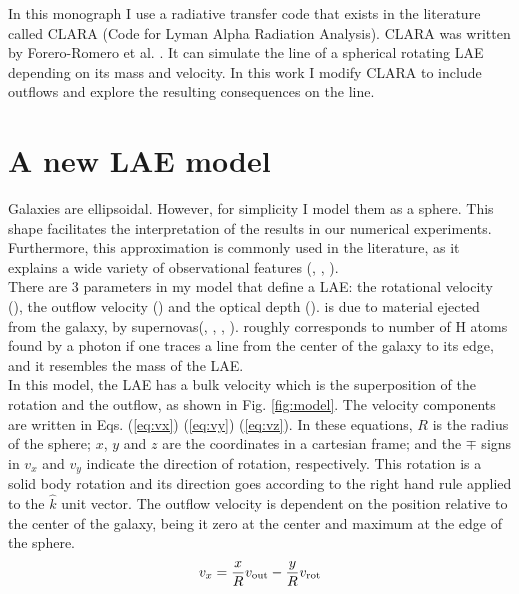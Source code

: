 \documentclass[twocolappendix]{latex/emulateapj}
\begin{document}
In this monograph I use a radiative transfer code that exists in the literature called CLARA (Code for Lyman Alpha Radiation Analysis). CLARA was written by Forero-Romero et al. \cite{CLARA}. It can simulate the \lya line of a spherical rotating LAE depending on its mass and velocity. In this work I modify CLARA to include outflows and explore the resulting consequences on the \lya line. \\


\section{A new LAE model}

\label{sec:newmodel}
Galaxies are ellipsoidal. However, for simplicity I model them as a sphere. This shape facilitates the interpretation of the results in our numerical experiments. Furthermore, this approximation is commonly used in the literature, as it explains a wide variety of observational features (\cite{Ahn03}, \cite{Verhamme06}, \cite{Dijkstra06}). \\

There are 3 parameters in my model that define a LAE: the rotational velocity (\vrot), the outflow velocity (\vout) and the optical depth (\tauh). \vout is due to material ejected from the galaxy, by supernovas(\cite{Verhamme06}, \cite{Orsi12}, \cite{Hashimoto2015}, \cite{Gronke2015}). \tauh roughly corresponds to number of H atoms found by a \lya photon if one traces a line from the center of the galaxy to its edge, and it resembles the mass of the LAE.\\

In this model, the LAE has a bulk velocity which is the superposition of the rotation and the outflow, as shown in Fig. \ref{fig:model}. The velocity components are written in Eqs. (\ref{eq:vx}) (\ref{eq:vy}) (\ref{eq:vz}). In these equations, $R$ is the radius of the sphere; $x$, $y$ and $z$ are the coordinates in a cartesian frame; and the $\mp$ signs in $v_x$ and $v_y$ indicate the direction of rotation, respectively. This rotation is a solid body rotation and its direction goes according to the right hand rule applied to the $\hat{k}$ unit vector. The outflow velocity is dependent on the position relative to the center of the galaxy, being it zero at the center and maximum at the edge of the sphere.\\

\begin{equation}
	v_{x}=\frac{x}{R}v_{\rm out}-\frac{y}{R}v_{\rm rot} 
	\label{eq:vx}
\end{equation}
\end{document}
